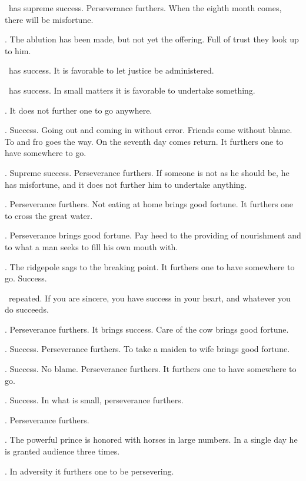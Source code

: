 {\nameit\ has supreme success.
 Perseverance furthers.
 When the eighth month comes,
 there will be misfortune.}

{\nameit. The ablution has been made,
 but not yet the offering.
 Full of trust they look up to him.}

{\nameit\ has success.
 It is favorable to let justice be administered.}

{\nameit\ has success.
 In small matters
 it is favorable to undertake something.}

{\nameit. It does not further one
 to go anywhere.}

{\nameit. Success.
 Going out and coming in without error.
 Friends come without blame.
 To and fro goes the way.
 On the seventh day comes return.
 It furthers one to have somewhere to go.}

{\nameit. Supreme success.
 Perseverance furthers.
 If someone is not as he should be,
 he has misfortune,
 and it does not further him
 to undertake anything.}

{\nameit.
 Perseverance furthers.
 Not eating at home brings good fortune.
 It furthers one to cross the great water.}

{\nameit.
 Perseverance brings good fortune.
 Pay heed to the providing of nourishment
 and to what a man seeks
 to fill his own mouth with.}

{\nameit.
 The ridgepole sags to the breaking point.
 It furthers one to have somewhere to go.
 Success.}

{\nameit\ repeated.
 If you are sincere, you have success in your heart,
 and whatever you do succeeds.}

{\nameit. Perseverance furthers.
 It brings success.
 Care of the cow brings good fortune.}

{\nameit. Success.
 Perseverance furthers.
 To take a maiden to wife brings good fortune.}

{\nameit. Success. No blame.
 Perseverance furthers.
 It furthers one to have somewhere to go.}

{\nameit. Success.
 In what is small, perseverance furthers.}

{\nameit. Perseverance furthers.}

{\nameit. The powerful prince
 is honored with horses in large numbers.
 In a single day he is granted audience three times.}

{\nameit. In adversity
 it furthers one to be persevering.}

